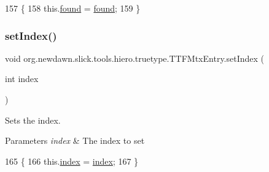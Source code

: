 \begin{DoxyCode}
157                                      \{
158         this.\mbox{\hyperlink{classorg_1_1newdawn_1_1slick_1_1tools_1_1hiero_1_1truetype_1_1_t_t_f_mtx_entry_ad1a3b3d97c0f3c15b408e732fcf42d15}{found}} = \mbox{\hyperlink{classorg_1_1newdawn_1_1slick_1_1tools_1_1hiero_1_1truetype_1_1_t_t_f_mtx_entry_ad1a3b3d97c0f3c15b408e732fcf42d15}{found}};
159     \}
\end{DoxyCode}
\mbox{\label{classorg_1_1newdawn_1_1slick_1_1tools_1_1hiero_1_1truetype_1_1_t_t_f_mtx_entry_a25f43d5cf65c9c95fee77db5f2fd1a55}} 
\subsubsection{\texorpdfstring{set\+Index()}{setIndex()}}
{\footnotesize\ttfamily void org.\+newdawn.\+slick.\+tools.\+hiero.\+truetype.\+T\+T\+F\+Mtx\+Entry.\+set\+Index (\begin{DoxyParamCaption}\item[{int}]{index }\end{DoxyParamCaption})\hspace{0.3cm}{\ttfamily [inline]}}

Sets the index. 
\begin{DoxyParams}{Parameters}
{\em index} & The index to set \\
\hline
\end{DoxyParams}

\begin{DoxyCode}
165                                     \{
166         this.\mbox{\hyperlink{classorg_1_1newdawn_1_1slick_1_1tools_1_1hiero_1_1truetype_1_1_t_t_f_mtx_entry_ac037daf319dec24b16cad78d36505084}{index}} = \mbox{\hyperlink{classorg_1_1newdawn_1_1slick_1_1tools_1_1hiero_1_1truetype_1_1_t_t_f_mtx_entry_ac037daf319dec24b16cad78d36505084}{index}};
167     \}
\end{DoxyCode}
\mbox{\label{classorg_1_1newdawn_1_1slick_1_1tools_1_1hiero_1_1truetype_1_1_t_t_f_mtx_entry_aab4b3aae152563fee91e90e048a98bf1}} 
